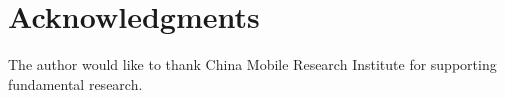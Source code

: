 \documentclass[11pt,a4paper]{article}
\theoremstyle{plain}
\theoremstyle{definition}
\theoremstyle{remark}
\begin{document}




















\appendix

















\section*{Acknowledgments}
The author would like to thank China Mobile Research Institute for supporting fundamental research.
\end{document}
